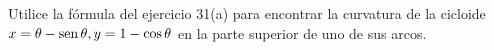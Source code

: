 \item Utilice la fórmula del ejercicio 31(a) para encontrar la curvatura de la cicloide $x = \theta - \operatorname{sen} \theta, y = 1 - \cos \theta$ en la parte superior de uno de sus arcos.
